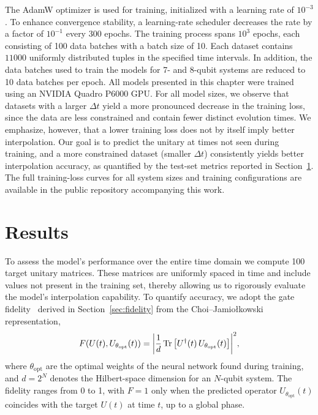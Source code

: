 The AdamW optimizer is used for training, initialized with a learning rate of $10^{-3}$. To enhance convergence stability, a learning-rate scheduler decreases the rate by a factor of $10^{-1}$ every 300 epochs. The training process spans $10^3$ epochs, each consisting of 100 data batches with a batch size of 10. Each dataset contains $11000$ uniformly distributed tuples in the specified time intervals. In addition, the data batches used to train the models for 7- and 8-qubit systems are reduced to 10 data batches per epoch. All models presented in this chapter were trained using an NVIDIA Quadro P6000 GPU. For all model sizes, we observe that datasets with a larger $\Delta t$ yield a more pronounced decrease in the training loss, since the data are less constrained and contain fewer distinct evolution times. We emphasize, however, that a lower training loss does not by itself imply better interpolation. Our goal is to predict the unitary at times not seen during training, and a more constrained dataset (smaller $\Delta t$) consistently yields better interpolation accuracy, as quantified by the test-set metrics reported in Section~\ref{sec:res-results}. The full training-loss curves for all system sizes and training configurations are available in the public repository accompanying this work.

\section{Results}
\label{sec:res-results}

To assess the model's performance over the entire time domain we compute 100 target unitary matrices. These matrices are uniformly spaced in time and include values not present in the training set, thereby allowing us to rigorously evaluate the model's interpolation capability. To quantify accuracy, we adopt the gate fidelity~\cite{cabrera2011} derived in Section~\ref{sec:fidelity} from the Choi--Jamio\l{}kowski representation,
\begin{equation}
  \label{eq:res-metric-fidelity}
  F(U(t), U_{\theta_{\mathrm{opt}}}(t)) = \abs{ \frac{1}{d} \Tr\qty[ U^{\dagger}(t)\, U_{\theta_{\mathrm{opt}}}(t) ] }^2,
\end{equation}
where $\theta_{\mathrm{opt}}$ are the optimal weights of the neural network found during training, and $d = 2^N$ denotes the Hilbert-space dimension for an $N$-qubit system. The fidelity ranges from 0 to 1, with $F = 1$ only when the predicted operator $U_{\theta_{\mathrm{opt}}}(t)$ coincides with the target $U(t)$ at time $t$, up to a global phase.

